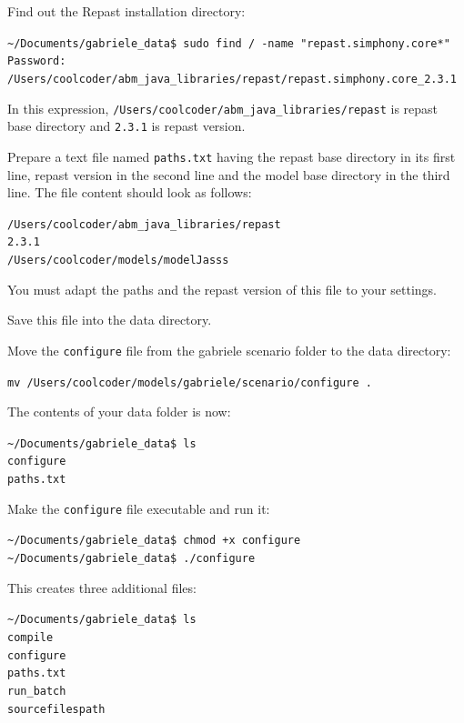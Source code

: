 \documentclass{book}
\begin{document}
Find out the Repast installation directory:

\vskip2mm
\noindent\verb+~/Documents/gabriele_data$ +\color{red}\verb+sudo find / -name "repast.simphony.core*"+ \color{black}
\verb+Password:+ \\ \color{blue}
\verb+/Users/coolcoder/abm_java_libraries/repast/repast.simphony.core_2.3.1 +\\
\color{black}
\vskip2mm

In this expression, \verb+/Users/coolcoder/abm_java_libraries/repast+ is repast base directory and \verb+2.3.1+ is repast version.

Prepare a text file named \verb+paths.txt+ having the repast base directory in its first line, repast version in the second line and the model base directory in the third line. The file content should look as follows:

\color{magenta}
\vskip2mm \noindent
\verb+/Users/coolcoder/abm_java_libraries/repast+ \\
\verb+2.3.1+ \\
\verb+/Users/coolcoder/models/modelJasss+
\vskip2mm

\color{black}
You must adapt the paths and the repast version of this file to your settings.

Save this file into the data directory.

Move the \verb+configure+ file from the gabriele scenario folder to the data directory:

\verb+mv /Users/coolcoder/models/gabriele/scenario/configure . +


The contents of your data folder is now:

\vskip2mm
\noindent\verb+~/Documents/gabriele_data$ +\color{red}\verb+ls+ \color{blue}\\
\verb+configure+ \\
\verb+paths.txt+
\color{black}

\vskip2mm
Make the \verb+configure+ file executable and run it:

\vskip2mm
\noindent\verb+~/Documents/gabriele_data$ +\color{red}\verb|chmod +x configure| \color{black}\\
\verb+~/Documents/gabriele_data$ +\color{red}\verb|./configure| \color{black}

\vskip2mm
This creates three additional files:

\vskip2mm
\noindent\verb+~/Documents/gabriele_data$ +\color{red}\verb+ls+ \color{blue}\\
\verb+compile+\\ \color{green}
\verb+configure+\\ \color{blue}
\verb+paths.txt+ \\
\verb+run_batch+ \\
\verb+sourcefilespath+
\color{black}
\end{document}
